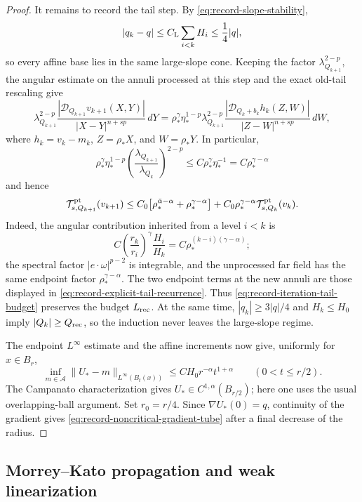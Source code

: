 \documentclass[11pt,reqno]{amsart}
\numberwithin{equation}{section}
\newcommand{\dd}{\,d}
\theoremstyle{remark}
\begin{document}
\begin{proof}
It remains to record the tail step.  By
\eqref{eq:record-slope-stability},
\[
 |q_k-q|\le C_{\rm L}\sum_{i<k}H_i\le\frac14|q|,
\]
so every affine base lies in the same large-slope cone.  Keeping the
factor \(\lambda_{Q_{k+1}}^{2-p}\), the angular estimate on the
annuli processed at this step and the exact old-tail rescaling give
\[
 \lambda_{Q_{k+1}}^{2-p}
 \frac{|\mathcal D_{Q_{k+1}}v_{k+1}(X,Y)|}
 {|X-Y|^{n+sp}}\dd Y
 =
 \rho_*^\gamma\eta_*^{1-p}\lambda_{Q_{k+1}}^{2-p}
 \frac{|\mathcal D_{Q_k+b_k}h_k(Z,W)|}
 {|Z-W|^{n+sp}}\dd W,
\]
where \(h_k=v_k-m_k\), \(Z=\rho_*X\), and \(W=\rho_*Y\).  In
particular,
\[
 \rho_*^\gamma\eta_*^{1-p}
 \left(\frac{\lambda_{Q_{k+1}}}{\lambda_{Q_k}}\right)^{2-p}
 \le C\rho_*^\gamma\eta_*^{-1}
 =C\rho_*^{\gamma-\alpha}
\]
and hence
\begin{equation}
 \mathcal T^{\rm pt}_{s,Q_{k+1}}(v_{k+1})
 \le C_0\bigl[\rho_*^{\bar\alpha-\alpha}
              +\rho_*^{\gamma-\alpha}\bigr]
 +C_0\rho_*^{\gamma-\alpha}
   \mathcal T^{\rm pt}_{s,Q_k}(v_k).
 \label{eq:record-explicit-tail-recurrence}
\end{equation}
Indeed, the angular contribution inherited from a level \(i<k\) is
\[
 C\left(\frac{r_k}{r_i}\right)^\gamma\frac{H_i}{H_k}
 =C\rho_*^{(k-i)(\gamma-\alpha)};
\]
the spectral factor \(|e\cdot\omega|^{p-2}\) is integrable, and the
unprocessed far field has the same endpoint factor
\(\rho_*^{\gamma-\alpha}\).  The two endpoint terms at the new annuli
are those displayed in
\eqref{eq:record-explicit-tail-recurrence}.  Thus
\eqref{eq:record-iteration-tail-budget} preserves the budget
\(L_{\rm rec}\).  At the same time,
\(|q_k|\ge3|q|/4\) and \(H_k\le H_0\) imply
\(|Q_k|\ge Q_{\rm rec}\), so the induction never leaves the
large-slope regime.

The endpoint \(L^\infty\) estimate and the affine increments now give,
uniformly for \(x\in B_r\),
\begin{equation*}
 \inf_{m\in\mathcal A}
 \|U_*-m\|_{L^\infty(B_t(x))}
 \le C H_0r^{-\alpha}t^{1+\alpha}
 \qquad(0<t\le r/2).
\end{equation*}
The Campanato characterization gives
\(U_*\in C^{1,\alpha}(B_{r/2})\); here one uses the usual
overlapping-ball argument.  Set \(r_0=r/4\).  Since
\(\nabla U_*(0)=q\), continuity of the gradient gives
\eqref{eq:record-noncritical-gradient-tube} after a final decrease of
the radius.
\end{proof}

\subsection{Morrey--Kato propagation and weak linearization}
\label{subsec:morrey-kato-linearization}
\end{document}
